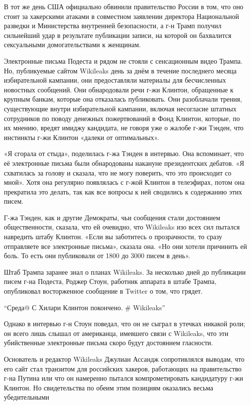 В тот же день США официально обвинили правительство России в том, что
оно стоит за хакерскими атаками в совместном заявлении директора
Национальной разведки и Министерства внутренней безопасности, а г-н
Трамп получил сильнейший удар в результате публикации записи, на которой
он бахвалится сексуальными домогательствами к женщинам.

Электронные письма Подеста и рядом не стояли с сенсационным видео
Трампа. Но, публикуемые сайтом Wikileaks день за днём в течение
последнего месяца избирательной кампании, они предоставляли материалы
для бесчисленных новостных сообщений. Они обнародовали речи г-жи
Клинтон, обращенные к крупным банкам, которые она отказалась
публиковать. Они разоблачали трения, существующие внутри избирательной
кампании, включая несогласие штатных сотрудников по поводу денежных
пожертвований в Фонд Клинтон, которые, по их мнению, вредят имиджу
кандидата, не говоря уже о жалобе г-жи Тэнден, что инстинкты г-жи
Клинтон «далеки от оптимальных».

«Я сгорала от стыда», поделилась г-жа Тэнден в интервью. Она вспоминает,
что её электронные письма были обнародованы накануне президентских
дебатов. «Я схватилась за голову и сказала, что не могу поверить, что
это происходит со мной». Хотя она регулярно появлялась с г-жой Клинтон в
телеэфирах, потом она прекратила это делать, так как все вопросы к ней
сводились к содержанию этих писем.

Г-жа Тэнден, как и другие Демократы, чьи сообщения стали достоянием
общественности, сказала, что ей очевидно, что Wikileaks изо всех сил
пытался навредить штабу Клинтон. «Если вы заботитесь о прозрачности, то
сразу отправляете все электронные письма», сказала она. «Но они хотели
причинить ей боль. То есть они публиковали от 1800 до 3000 писем в
день».

Штаб Трампа заранее знал о планах Wikileaks. За несколько дней до
публикации писем г-на Подеста, Роджер Стоун, работник аппарата в штабе
Трампа, опубликовал восторженное сообщение в Twitter о том, что грядет.

``Среда@ С Хилари Клинтон покончено. \# Wikileaks''

Однако в интервью г-н Стоун поведал, что он не сыграл в утечках никакой
роли; он всего лишь слышал от американца, имевшего связи с Wikileaks,
что эти убийственные электронные письма скоро будут достоянием
гласности.

Основатель и редактор Wikileaks Джулиан Ассандж сопротивлялся выводам,
что его сайт стал транзитом для российских хакеров, работающих на
правительство г-на Путина или что он намеренно пытался компрометировать
кандидатуру г-жи Клинтон. Но свидетельства по обеим этим позициям
оказались весьма убедительными

